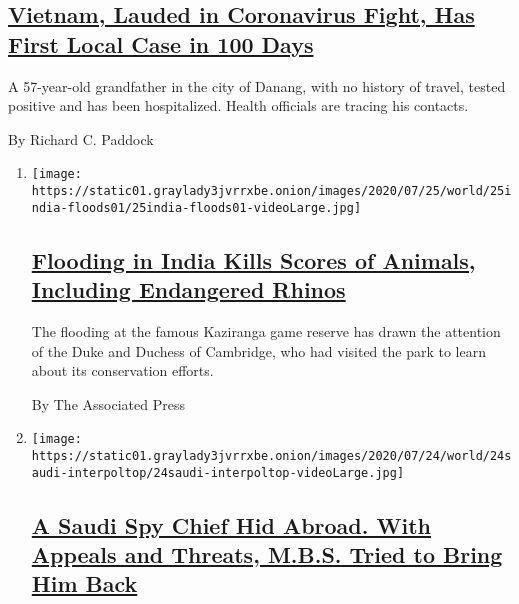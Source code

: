 \begin{enumerate}
{  \subsection{\texorpdfstring{\href{/2020/07/25/world/asia/coronavirus-vietnam.html}{Vietnam,
  Lauded in Coronavirus Fight, Has First Local Case in 100
  Days}}{Vietnam, Lauded in Coronavirus Fight, Has First Local Case in 100 Days}}\label{vietnam-lauded-in-coronavirus-fight-has-first-local-case-in-100-days}}

  A 57-year-old grandfather in the city of Danang, with no history of
  travel, tested positive and has been hospitalized. Health officials
  are tracing his contacts.

  By Richard C. Paddock
\end{enumerate}

\begin{enumerate}
\def\labelenumi{\arabic{enumi}.}
\item
  \texttt{[image: https://static01.graylady3jvrrxbe.onion/images/2020/07/25/world/25india-floods01/25india-floods01-videoLarge.jpg]}

  \hypertarget{flooding-in-india-kills-scores-of-animals-including-endangered-rhinos}{%
  \subsection{\texorpdfstring{\href{/2020/07/25/world/asia/india-floods-rhinos.html}{Flooding
  in India Kills Scores of Animals, Including Endangered
  Rhinos}}{Flooding in India Kills Scores of Animals, Including Endangered Rhinos}}\label{flooding-in-india-kills-scores-of-animals-including-endangered-rhinos}}

  The flooding at the famous Kaziranga game reserve has drawn the
  attention of the Duke and Duchess of Cambridge, who had visited the
  park to learn about its conservation efforts.

  By The Associated Press
\item
  \texttt{[image: https://static01.graylady3jvrrxbe.onion/images/2020/07/24/world/24saudi-interpoltop/24saudi-interpoltop-videoLarge.jpg]}

  \hypertarget{a-saudi-spy-chief-hid-abroad-with-appeals-and-threats-mbs-tried-to-bring-him-back}{%
  \subsection{\texorpdfstring{\href{/2020/07/24/world/middleeast/Saudi-spy-mbs-extradition.html}{A
  Saudi Spy Chief Hid Abroad. With Appeals and Threats, M.B.S. Tried to
  Bring Him
  Back}}{A Saudi Spy Chief Hid Abroad. With Appeals and Threats, M.B.S. Tried to Bring Him Back}}\label{a-saudi-spy-chief-hid-abroad-with-appeals-and-threats-mbs-tried-to-bring-him-back}}


\end{enumerate}
